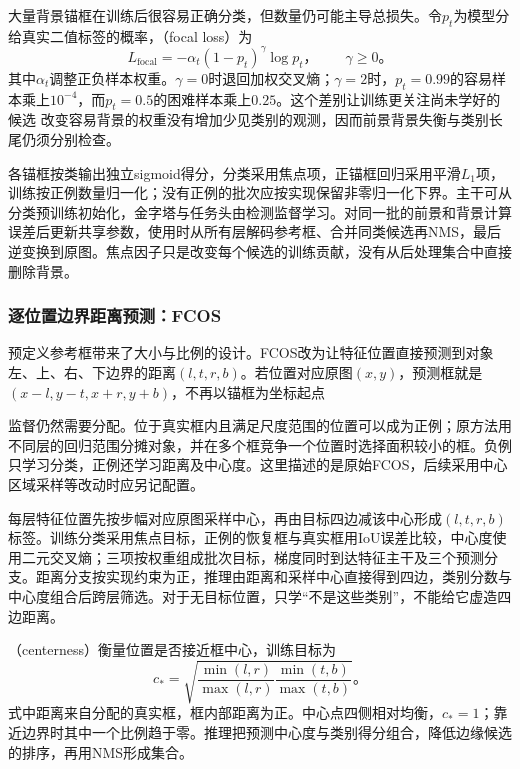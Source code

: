大量背景锚框在训练后很容易正确分类，但数量仍可能主导总损失。令$p_t$为模型分给真实二值标签的概率，（focal loss）为
\begin{equation}
 L_{\mathrm{focal}}=-\alpha_t(1-p_t)^\gamma\log p_t\text{，}
 \qquad\gamma\geq0\text{。}
 \label{eq:vision-focal-loss}
\end{equation}
其中$\alpha_t$调整正负样本权重。$\gamma=0$时退回加权交叉熵；$\gamma=2$时，$p_t=0.99$的容易样本乘上$10^{-4}$，而$p_t=0.5$的困难样本乘上$0.25$。这个差别让训练更关注尚未学好的候选
改变容易背景的权重没有增加少见类别的观测，因而前景背景失衡与类别长尾仍须分别检查。

各锚框按类输出独立sigmoid得分，分类采用焦点项，正锚框回归采用平滑$L_1$项，训练按正例数量归一化；没有正例的批次应按实现保留非零归一化下界。主干可从分类预训练初始化，金字塔与任务头由检测监督学习。对同一批的前景和背景计算误差后更新共享参数，使用时从所有层解码参考框、合并同类候选再NMS，最后逆变换到原图。焦点因子只是改变每个候选的训练贡献，没有从后处理集合中直接删除背景。

\subsubsection{逐位置边界距离预测：FCOS}
\label{sec:vision-recognition-fcos}

预定义参考框带来了大小与比例的设计。FCOS改为让特征位置直接预测到对象左、上、右、下边界的距离$(l,t,r,b)$。若位置对应原图$(x,y)$，预测框就是$(x-l,y-t,x+r,y+b)$，不再以锚框为坐标起点

监督仍然需要分配。位于真实框内且满足尺度范围的位置可以成为正例；原方法用不同层的回归范围分摊对象，并在多个框竞争一个位置时选择面积较小的框。负例只学习分类，正例还学习距离及中心度。这里描述的是原始FCOS，后续采用中心区域采样等改动时应另记配置。

每层特征位置先按步幅对应原图采样中心，再由目标四边减该中心形成$(l,t,r,b)$标签。训练分类采用焦点目标，正例的恢复框与真实框用IoU误差比较，中心度使用二元交叉熵；三项按权重组成批次目标，梯度同时到达特征主干及三个预测分支。距离分支按实现约束为正，推理由距离和采样中心直接得到四边，类别分数与中心度组合后跨层筛选。对于无目标位置，只学“不是这些类别”，不能给它虚造四边距离。

（centerness）衡量位置是否接近框中心，训练目标为
\begin{equation}
 c_*=\sqrt{\frac{\min(l,r)}{\max(l,r)}
                 \frac{\min(t,b)}{\max(t,b)}}\text{。}
 \label{eq:vision-fcos-centerness}
\end{equation}
式中距离来自分配的真实框，框内部距离为正。中心点四侧相对均衡，$c_*=1$；靠近边界时其中一个比例趋于零。推理把预测中心度与类别得分组合，降低边缘候选的排序，再用NMS形成集合。


